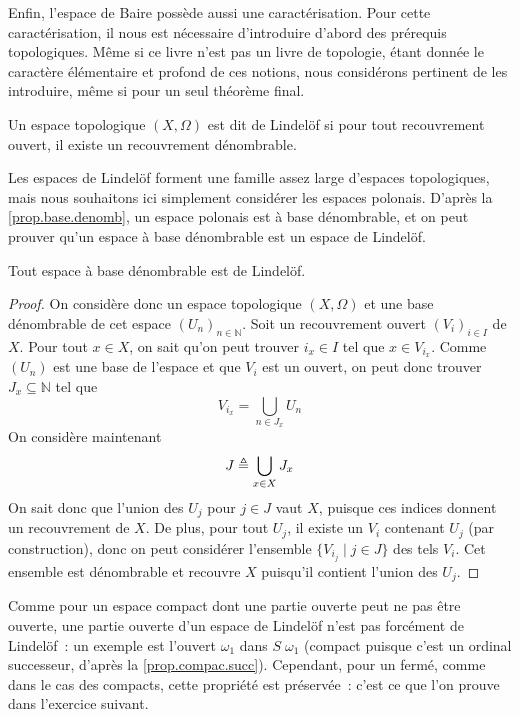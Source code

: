Enfin, l'espace de Baire possède aussi une caractérisation. Pour cette
caractérisation, il nous est nécessaire d'introduire d'abord des prérequis
topologiques. Même si ce livre n'est pas un livre de topologie, étant donnée le
caractère élémentaire et profond de ces notions, nous considérons pertinent de
les introduire, même si pour un seul théorème final.

\begin{definition}
  Un espace topologique $(X,\Omega)$ est dit de Lindelöf si pour tout
  recouvrement ouvert, il existe un recouvrement dénombrable.
\end{definition}

Les espaces de Lindelöf forment une famille assez large d'espaces topologiques,
mais nous souhaitons ici simplement considérer les espaces polonais. D'après
la \cref{prop.base.denomb}, un espace polonais est à base dénombrable, et on
peut prouver qu'un espace à base dénombrable est un espace de Lindelöf.

\begin{lemma}[Lindelöf]\label{lem.lindelof}
  Tout espace à base dénombrable est de Lindelöf.
\end{lemma}

\begin{proof}
  On considère donc un espace topologique $(X,\Omega)$ et une base dénombrable
  de cet espace $(U_n)_{n \in \mathbb N}$. Soit un recouvrement ouvert
  $(V_i)_{i \in I}$ de $X$. Pour tout $x \in X$, on sait qu'on peut trouver
  $i_x \in I$ tel que $x \in V_{i_x}$. Comme $(U_n)$ est une base de l'espace et
  que $V_i$ est un ouvert, on peut donc trouver $J_x \subseteq \mathbb N$ tel
  que
  \[V_{i_x} = \bigcup_{n \in J_x} U_n\]
  On considère maintenant
  \[J \triangleq \bigcup_{x \in X} J_x\]
  On sait donc que l'union des $U_j$ pour $j \in J$ vaut $X$, puisque ces
  indices donnent un recouvrement de $X$. De plus, pour tout $U_j$, il existe
  un $V_i$ contenant $U_j$ (par construction), donc on peut considérer
  l'ensemble $\{V_{i_j}\mid j \in J\}$ des tels $V_i$. Cet ensemble est
  dénombrable et recouvre $X$ puisqu'il contient l'union des $U_j$.
\end{proof}

Comme pour un espace compact dont une partie ouverte peut ne pas être ouverte,
une partie ouverte d'un espace de Lindelöf n'est pas forcément de Lindelöf~:
un exemple est l'ouvert $\omega_1$ dans $S\;\omega_1$ (compact puisque c'est un
ordinal successeur, d'après la \cref{prop.compac.succ}). Cependant, pour un
fermé, comme dans le cas des compacts, cette propriété est préservée~: c'est ce
que l'on prouve dans l'exercice suivant.

